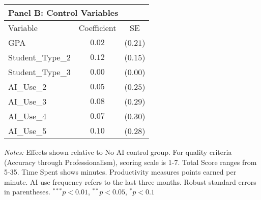 \begin{table}[!htbp]
\vspace{0.3cm}

\begin{tabular}{lcc}
\multicolumn{3}{l}{\textbf{Panel B: Control Variables}} \\
\hline\hline
Variable & Coefficient & SE \\
\hline
GPA & $0.02$ & ($0.21$) \\
Student_Type_2 & $0.12$ & ($0.15$) \\
Student_Type_3 & $0.00$ & ($0.00$) \\
AI_Use_2 & $0.05$ & ($0.25$) \\
AI_Use_3 & $0.08$ & ($0.29$) \\
AI_Use_4 & $0.07$ & ($0.30$) \\
AI_Use_5 & $0.10$ & ($0.28$) \\
\hline
\end{tabular}
\begin{tablenotes}
\small
\item \textit{Notes:} Effects shown relative to No AI control group. For quality criteria (Accuracy through Professionalism), scoring scale is 1-7. Total Score ranges from 5-35. Time Spent shows minutes. Productivity measures points earned per minute. AI use frequency refers to the last three months. Robust standard errors in parentheses. $^{***}p<0.01$, $^{**}p<0.05$, $^{*}p<0.1$
\end{tablenotes}
\end{table}